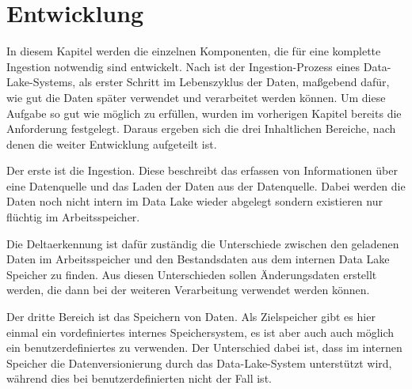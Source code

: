 \chapter{Entwicklung}
In diesem Kapitel werden die einzelnen Komponenten, die für eine komplette Ingestion notwendig sind entwickelt.
Nach \citeauthor{DL-Ing-Mgmt} ist der Ingestion-Prozess eines Data-Lake-Systems, als erster Schritt im Lebenszyklus der Daten, maßgebend dafür, wie gut die Daten später verwendet und verarbeitet werden können.
Um diese Aufgabe so gut wie möglich zu erfüllen, wurden im vorherigen Kapitel bereits die Anforderung festgelegt.
Daraus ergeben sich die drei Inhaltlichen Bereiche, nach denen die weiter Entwicklung aufgeteilt ist.

Der erste ist die Ingestion.
Diese beschreibt das erfassen von Informationen über eine Datenquelle und das Laden der Daten aus der Datenquelle.
Dabei werden die Daten noch nicht intern im Data Lake wieder abgelegt sondern existieren nur flüchtig im Arbeitsspeicher.

Die Deltaerkennung ist dafür zuständig die Unterschiede zwischen den geladenen Daten im Arbeitsspeicher und den Bestandsdaten aus dem internen Data Lake Speicher zu finden.
Aus diesen Unterschieden sollen Änderungsdaten erstellt werden, die dann bei der weiteren Verarbeitung verwendet werden können.

Der dritte Bereich ist das Speichern von Daten.
Als Zielspeicher gibt es hier einmal ein vordefiniertes internes Speichersystem, es ist aber auch auch möglich ein benutzerdefiniertes zu verwenden.
Der Unterschied dabei ist, dass im internen Speicher die Datenversionierung durch das Data-Lake-System unterstützt wird, während dies bei benutzerdefinierten nicht der Fall ist.






